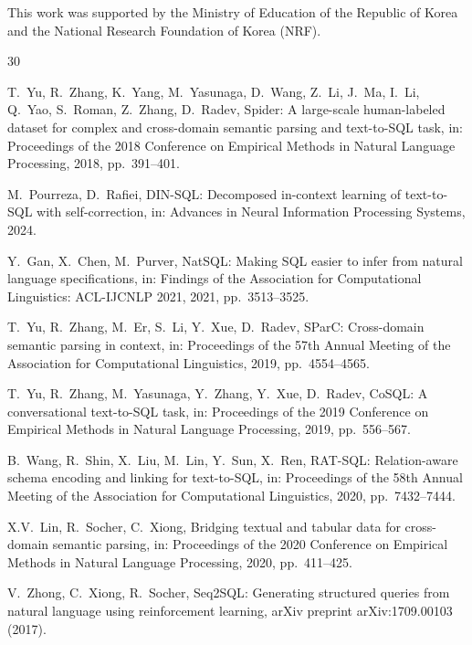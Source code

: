\documentclass[preprint,12pt,a4paper]{elsarticle}
\begin{document}
This work was supported by the Ministry of Education of the Republic of Korea and the National Research Foundation of Korea (NRF).

\begin{thebibliography}{30}

T.~Yu, R.~Zhang, K.~Yang, M.~Yasunaga, D.~Wang, Z.~Li, J.~Ma, I.~Li, Q.~Yao, S.~Roman, Z.~Zhang, D.~Radev,
Spider: A large-scale human-labeled dataset for complex and cross-domain semantic parsing and text-to-{SQL} task,
in: Proceedings of the 2018 Conference on Empirical Methods in Natural Language Processing, 2018, pp.~391--401.

M.~Pourreza, D.~Rafiei,
{DIN}-{SQL}: Decomposed in-context learning of text-to-{SQL} with self-correction,
in: Advances in Neural Information Processing Systems, 2024.

Y.~Gan, X.~Chen, M.~Purver,
{NatSQL}: Making {SQL} easier to infer from natural language specifications,
in: Findings of the Association for Computational Linguistics: {ACL}-{IJCNLP} 2021, 2021, pp.~3513--3525.

T.~Yu, R.~Zhang, M.~Er, S.~Li, Y.~Xue, D.~Radev,
{SParC}: Cross-domain semantic parsing in context,
in: Proceedings of the 57th Annual Meeting of the Association for Computational Linguistics, 2019, pp.~4554--4565.

T.~Yu, R.~Zhang, M.~Yasunaga, Y.~Zhang, Y.~Xue, D.~Radev,
{CoSQL}: A conversational text-to-{SQL} task,
in: Proceedings of the 2019 Conference on Empirical Methods in Natural Language Processing, 2019, pp.~556--567.

B.~Wang, R.~Shin, X.~Liu, M.~Lin, Y.~Sun, X.~Ren,
{RAT}-{SQL}: Relation-aware schema encoding and linking for text-to-{SQL},
in: Proceedings of the 58th Annual Meeting of the Association for Computational Linguistics, 2020, pp.~7432--7444.

X.V.~Lin, R.~Socher, C.~Xiong,
Bridging textual and tabular data for cross-domain semantic parsing,
in: Proceedings of the 2020 Conference on Empirical Methods in Natural Language Processing, 2020, pp.~411--425.

V.~Zhong, C.~Xiong, R.~Socher,
{Seq2SQL}: Generating structured queries from natural language using reinforcement learning,
arXiv preprint arXiv:1709.00103 (2017).


\end{thebibliography}
\end{document}
